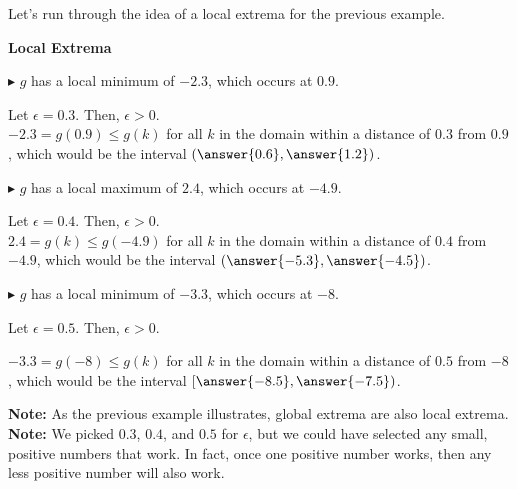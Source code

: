 \documentclass{ximera}
\begin{document}
Let's run through the idea of a local extrema for the previous example. 


\begin{explanation} \textbf{\textcolor{red!75!green}{Local Extrema}}  




$\blacktriangleright$ $g$ has a local minimum of $-2.3$, which occurs at $0.9$. 


Let $\epsilon = 0.3$.  Then, $\epsilon > 0$.   \\
$-2.3 = g(0.9) \leq g(k)$ for all $k$ in the domain within a distance of $0.3$ from $0.9$, which would be the interval $\left(\answer{0.6}, \answer{1.2}\right)$.




$\blacktriangleright$ $g$ has a local maximum of $2.4$, which occurs at $-4.9$. 






Let $\epsilon = 0.4$.  Then, $\epsilon > 0$.  \\
$2.4 = g(k) \leq g(-4.9)$ for all $k$ in the domain within a distance of $0.4$ from $-4.9$, which would be the interval $\left(\answer{-5.3}, \answer{-4.5}\right)$.




$\blacktriangleright$ $g$ has a local minimum of $-3.3$, which occurs at $-8$. 





Let $\epsilon = 0.5$.  Then, $\epsilon > 0$. 

$-3.3 = g(-8) \leq g(k)$ for all $k$ in the domain within a distance of $0.5$ from $-8$, which would be the interval $\left[\answer{-8.5}, \answer{-7.5}\right)$.


\end{explanation}


\textbf{Note:} As the previous example illustrates, global extrema are also local extrema. \\
\textbf{Note:} We picked $0.3$, $0.4$, and $0.5$ for $\epsilon$, but we could have selected any small, positive numbers that work. In fact, once one positive number works, then any less positive number will also work. 
\end{document}
